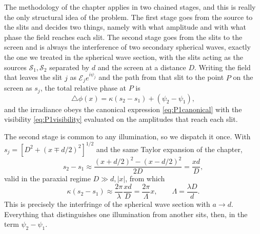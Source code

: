         The methodology of the chapter applies in two chained stages, and this is really the only structural idea of the problem. The first stage goes from the source to the slits and decides two things, namely with what amplitude and with what phase the field reaches each slit. The second stage goes from the slits to the screen and is always the interference of two secondary spherical waves, exactly the one we treated in the spherical wave section, with the slits acting as the sources $\mathcal{S}_1,\mathcal{S}_2$ separated by $d$ and the screen at a distance $D$. Writing the field that leaves the slit $j$ as $\mathcal{E}_j e^{i\psi_j}$ and the path from that slit to the point $P$ on the screen as $s_j$, the total relative phase at $P$ is
        \begin{equation}\label{eq:YoungPhase}
            \triangle\phi(x) = \kappa(s_2 - s_1) + (\psi_2 - \psi_1),
        \end{equation}
        and the irradiance obeys the canonical expression \ref{eq:P1canonical} with the visibility \ref{eq:P1visibility} evaluated on the amplitudes that reach each slit.

        The second stage is common to any illumination, so we dispatch it once. With $s_j = [D^2 + (x\mp d/2)^2]^{1/2}$ and the same Taylor expansion of the chapter,
        \begin{equation}
            s_2 - s_1 \approx \frac{(x+d/2)^2 - (x-d/2)^2}{2D} = \frac{xd}{D},
        \end{equation}
        valid in the paraxial regime $D \gg d,|x|$, from which
        \begin{equation}\label{eq:YoungStage2}
            \kappa(s_2 - s_1) \approx \frac{2\pi}{\lambda}\frac{xd}{D} = \frac{2\pi}{\Lambda}x, \qquad \Lambda = \frac{\lambda D}{d}.
        \end{equation}
        This is precisely the interfringe of the spherical wave section with $a\to d$. Everything that distinguishes one illumination from another sits, then, in the term $\psi_2 - \psi_1$.

